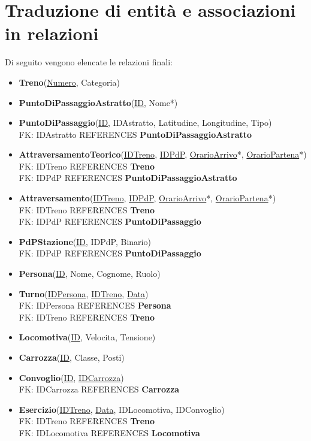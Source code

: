 \documentclass[a4paper,12pt]{report}
\begin{document}
	\section{Traduzione di entità e associazioni in relazioni}
	Di seguito vengono elencate le relazioni finali:
	\begin{itemize}
		\item \textbf{Treno}(\underline{Numero}, Categoria)
		\item \textbf{PuntoDiPassaggioAstratto}(\underline{ID}, Nome*)
		\item \textbf{PuntoDiPassaggio}(\underline{ID}, IDAstratto, Latitudine, Longitudine, Tipo)\\
			FK: IDAstratto REFERENCES \textbf{PuntoDiPassaggioAstratto}
		\item \textbf{AttraversamentoTeorico}(\underline{IDTreno}, \underline{IDPdP}, \underline{OrarioArrivo}*, \underline{OrarioPartena}*)\\
			FK: IDTreno REFERENCES \textbf{Treno}\\
			FK: IDPdP REFERENCES \textbf{PuntoDiPassaggioAstratto}
		\item \textbf{Attraversamento}(\underline{IDTreno}, \underline{IDPdP}, \underline{OrarioArrivo}*, \underline{OrarioPartena}*)\\
			FK: IDTreno REFERENCES \textbf{Treno}\\
			FK: IDPdP REFERENCES \textbf{PuntoDiPassaggio}
		\item \textbf{PdPStazione}(\underline{ID}, IDPdP, Binario)\\
			FK: IDPdP REFERENCES \textbf{PuntoDiPassaggio}
		\item \textbf{Persona}(\underline{ID}, Nome, Cognome, Ruolo)
		\item \textbf{Turno}(\underline{IDPersona}, \underline{IDTreno}, \underline{Data})\\
			FK: IDPersona REFERENCES \textbf{Persona}\\
			FK: IDTreno REFERENCES \textbf{Treno}
		\item \textbf{Locomotiva}(\underline{ID}, Velocita, Tensione)
		\item \textbf{Carrozza}(\underline{ID}, Classe, Posti)
		\item \textbf{Convoglio}(\underline{ID}, \underline{IDCarrozza})\\
			FK: IDCarrozza REFERENCES \textbf{Carrozza}
		\item \textbf{Esercizio}(\underline{IDTreno}, \underline{Data}, IDLocomotiva, IDConvoglio)\\
			FK: IDTreno REFERENCES \textbf{Treno}\\
			FK: IDLocomotiva REFERENCES \textbf{Locomotiva}
	\end{itemize}
	
\end{document}
